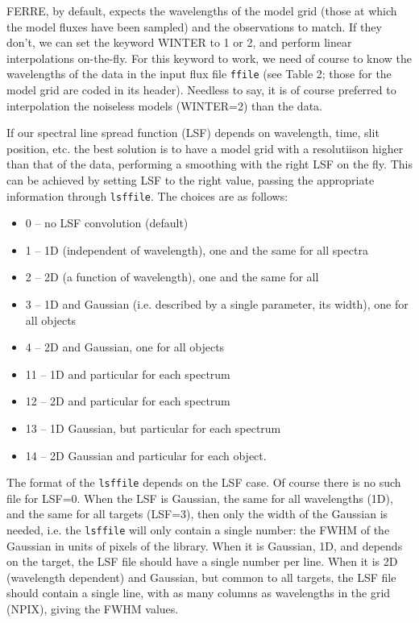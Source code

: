 \documentclass[12pt]{article}
\begin{document}
FERRE, by default, expects the wavelengths of the model grid (those at which
the model fluxes have been sampled) and the observations to match. If they don't,
we can set the keyword WINTER to 1 or 2, and perform linear interpolations
on-the-fly. For this keyword to work, we need of course to know the wavelengths
of the data in the input flux file {\tt ffile} (see Table 2; those for the model
grid are coded in its header).
Needless to say, it is of course preferred to interpolation the noiseless 
models (WINTER=2) than the data.

If our spectral line spread function (LSF) depends on wavelength, time, slit
position, etc. the best solution is to have a model grid with a resolutiison higher
than that of the data, performing a smoothing with the right LSF on the fly.
This can be achieved by setting LSF to the right value, passing the appropriate information
through {\tt lsffile}. The choices are as follows:
\begin{itemize}
\item 0 -- no LSF convolution (default)
\item 1 -- 1D (independent of wavelength), one and the same for all spectra
\item 2 -- 2D (a function of wavelength), one and the same for all
\item 3 -- 1D and Gaussian  (i.e. described by a single parameter, its width), one for all objects
\item 4 -- 2D and Gaussian, one for all objects
\item 11 -- 1D and particular for each spectrum
\item 12 -- 2D and particular for each spectrum
\item 13 -- 1D Gaussian, but particular for each spectrum
\item 14 -- 2D Gaussian and particular for each object.
\end{itemize}

The format of the {\tt lsffile} depends on the LSF case. Of course there is no
such file for LSF=0. When the LSF is Gaussian, the same for all wavelengths (1D), 
and the  same for all targets (LSF=3), then only the width of the Gaussian is needed,
i.e. the {\tt lsffile} will only contain a single number: the FWHM of the Gaussian in
units of pixels of the library. When it is Gaussian, 1D, and
depends on the target, the LSF file should have a single number per line. When it is
2D (wavelength dependent) and Gaussian, but common to all targets, the LSF file should
contain a single line, with as many columns as wavelengths in the grid (NPIX), giving the
FWHM values. 
\end{document}
